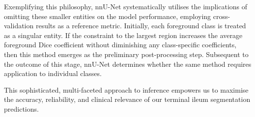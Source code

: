 Exemplifying this philosophy, nnU-Net systematically utilises the implications of omitting these smaller entities on the model performance, employing cross-validation results as a reference metric. Initially, each foreground class is treated as a singular entity. If the constraint to the largest region increases the average foreground Dice coefficient without diminishing any class-specific coefficients, then this method emerges as the preliminary post-processing step. Subsequent to the outcome of this stage, nnU-Net determines whether the same method requires application to individual classes.

This sophisticated, multi-faceted approach to inference empowers us to maximise the accuracy, reliability, and clinical relevance of our terminal ileum segmentation predictions.